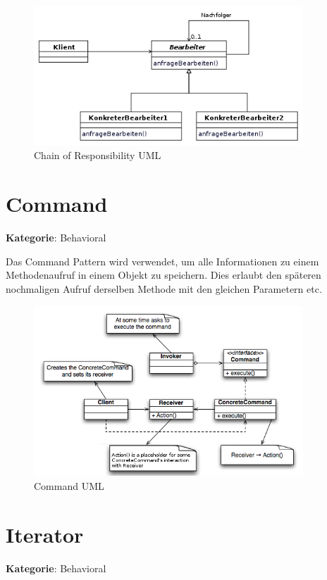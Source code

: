 \begin{figure}[H]
	\centering
	\includegraphics[width=0.9\textwidth]{content/gof/images/12-chain-of-responsibility-uml.png}
	\caption{Chain of Responsibility UML}
\end{figure}


\section{Command}
\textbf{Kategorie}: Behavioral

Das Command Pattern wird verwendet, um alle Informationen zu einem Methodenaufruf in einem Objekt zu speichern. Dies erlaubt den späteren nochmaligen Aufruf derselben Methode mit den gleichen Parametern etc.

\begin{figure}[H]
	\centering
	\includegraphics[width=0.9\textwidth]{content/gof/images/13-command-uml.png}
	\caption{Command UML}
\end{figure}


\section{Iterator}
\textbf{Kategorie}: Behavioral

